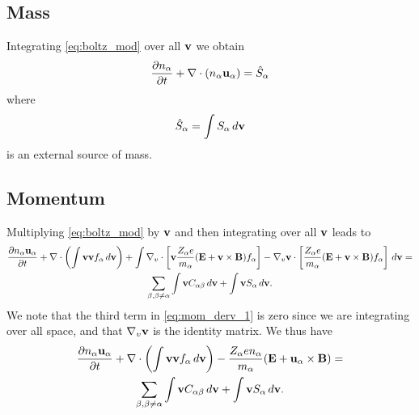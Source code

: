 \documentclass[a4paper,11pt]{report}
\begin{document}
\subsection{Mass}
Integrating \cref{eq:boltz_mod} over all $\mathbf{v}$ we obtain
\begin{equation}
\frac{\partial n_\alpha}{\partial t} + \nabla \cdot \left ( n_\alpha \mathbf{u}_\alpha \right ) = \hat{S}_\alpha
\end{equation}
where 
\begin{equation}
\hat{S}_\alpha = \int S_\alpha \, d\mathbf{v}
\end{equation}
is an external source of mass.

\subsection{Momentum}
Multiplying \cref{eq:boltz_mod} by $\mathbf{v}$ and then integrating over all $\mathbf{v}$ leads to
\begin{multline}
\label{eq:mom_derv_1}
\frac{\partial n_\alpha \mathbf{u}_\alpha}{\partial t} + \nabla \cdot \left ( \int \mathbf{v} \mathbf{v} f_\alpha \, d\mathbf{v} \right) + \int \nabla_v \cdot \left [ \mathbf{v} \frac{Z_\alpha e}{m_\alpha} ( \mathbf{E} + \mathbf{v} \times \mathbf{B} ) f_\alpha \right ] - \nabla_v \mathbf{v} \cdot \left [ \frac{Z_\alpha e}{m_\alpha} ( \mathbf{E} + \mathbf{v} \times \mathbf{B} ) f_\alpha \right ] \, d\mathbf{v} =\\
\sum_{\beta, \beta \ne \alpha} \int \mathbf{v} C_{\alpha \beta} \, d\mathbf{v} + \int \mathbf{v} S_\alpha \, d\mathbf{v}.
\end{multline}
We note that the third term in \cref{eq:mom_derv_1} is zero since we are integrating over all space, and that $\nabla_v \mathbf{v}$ is the identity matrix. We thus have
\begin{multline}
\label{eq:mom_derv_2}
\frac{\partial n_\alpha \mathbf{u}_\alpha}{\partial t} + \nabla \cdot \left ( \int \mathbf{v} \mathbf{v} f_\alpha \, d\mathbf{v} \right) - \frac{Z_\alpha e n_\alpha}{m_\alpha} ( \mathbf{E} + \mathbf{u}_\alpha \times \mathbf{B} ) =\\
\sum_{\beta, \beta \ne \alpha} \int \mathbf{v} C_{\alpha \beta} \, d\mathbf{v} + \int \mathbf{v} S_\alpha \, d\mathbf{v}.
\end{multline}
\end{document}
